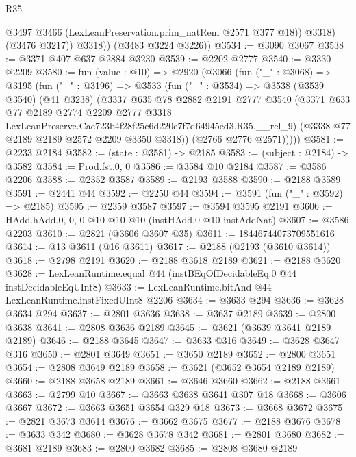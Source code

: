 \begin{lexlean}{R35}
\begin{coremodule}
                @3497
                @3466
                (LexLeanPreservation.prim_natRem @2571 @377 @18))
              @3318)
            (@3476 @3217))
          @3318))
      (@3483 @3224 @3226))
@3534 := @3090 @3067
@3538 := @3371 @407 @637 @2884 @3230
@3539 := @2202 @2777
@3540 := @3330 @2209
@3580 := fun (value : @10) =>
  @2920
    (@3066
      (fun ("_" : @3068) =>
      @3195
        (fun ("_" : @3196) =>
        @3533
          (fun ("_" : @3534) =>
          @3538
            (@3539 @3540)
            (@41 @3238)
            (@3337
              @635
              @78
              @2882
              @2191
              @2777
              @3540
              (@3371
                @633
                @77
                @2189
                @2774
                @2209
                @2777
                @3318
                LexLeanPreserve.Cae723b4f28f25c6d220e7f7d64945ed3.R35.__rel_9)
              (@3338 @77 @2189 @2189 @2572 @2209 @3350 @3318))
            (@2766 @2776 @2571)))))
@3581 := @2233 @2184
@3582 := (state : @3581) -> @2185
@3583 := (subject : @2184) -> @3582
@3584 := Prod.fst.{0, 0}
@3586 := @3584 @10 @2184
@3587 := @3586 @2206
@3588 := @2352 @3587
@3589 := @2193 @3588
@3590 := @2188 @3589
@3591 := @2441 @44
@3592 := @2250 @44
@3594 := @3591 (fun ("_" : @3592) => @2185)
@3595 := @2359 @3587
@3597 := @3594 @3595 @2191
@3606 := HAdd.hAdd.{0, 0, 0} @10 @10 @10 (instHAdd.{0} @10 instAddNat)
@3607 := @3586 @2203
@3610 := @2821 (@3606 @3607 @35)
@3611 := 18446744073709551616
@3614 := @13 @3611 (@16 @3611)
@3617 := @2188 (@2193 (@3610 @3614))
@3618 := @2798 @2191
@3620 := @2188 @3618 @2189
@3621 := @2188 @3620
@3628 := LexLeanRuntime.equal @44 (instBEqOfDecidableEq.{0} @44 instDecidableEqUInt8)
@3633 := LexLeanRuntime.bitAnd @44 LexLeanRuntime.instFixedUInt8 @2206
@3634 := @3633 @294
@3636 := @3628 @3634 @294
@3637 := @2801 @3636
@3638 := @3637 @2189
@3639 := @2800 @3638
@3641 := @2808 @3636 @2189
@3645 := @3621 (@3639 @3641 @2189 @2189)
@3646 := @2188 @3645
@3647 := @3633 @316
@3649 := @3628 @3647 @316
@3650 := @2801 @3649
@3651 := @3650 @2189
@3652 := @2800 @3651
@3654 := @2808 @3649 @2189
@3658 := @3621 (@3652 @3654 @2189 @2189)
@3660 := @2188 @3658 @2189
@3661 := @3646 @3660
@3662 := @2188 @3661
@3663 := @2799 @10
@3667 := @3663 @3638 @3641 @307 @18
@3668 := @3606 @3667
@3672 := @3663 @3651 @3654 @329 @18
@3673 := @3668 @3672
@3675 := @2821 @3673 @3614
@3676 := @3662 @3675
@3677 := @2188 @3676
@3678 := @3633 @342
@3680 := @3628 @3678 @342
@3681 := @2801 @3680
@3682 := @3681 @2189
@3683 := @2800 @3682
@3685 := @2808 @3680 @2189

\end{coremodule}
\end{lexlean}
